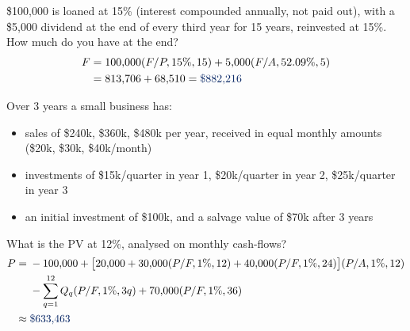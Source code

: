 \begin{example}
    \$100,000 is loaned at 15\% (interest compounded annually, not paid out),
    with a \$5,000 dividend at the end of every third year for 15 years,
    reinvested at 15\%. How much do you have at the end?
    \\
    \begin{align*}
        F &= 100{,}000(F/P,15\%,15) + 5{,}000(F/A,52.09\%,5)\\
        &= 813{,}706 + 68{,}510 = \db{\$882{,}216}
    \end{align*}
\end{example}

\begin{example}
    Over 3 years a small business has:
    \begin{itemize}
        \item sales of \$240k, \$360k, \$480k per year, received in equal monthly amounts (\$20k, \$30k, \$40k/month)
        \item investments of \$15k/quarter in year 1, \$20k/quarter in year 2, \$25k/quarter in year 3
        \item an initial investment of \$100k, and a salvage value of \$70k after 3 years
    \end{itemize}
    What is the PV at 12\%, analysed on monthly cash-flows?
    \\
    \begin{align*}
        P ={}& -100{,}000 + \big[20{,}000 + 30{,}000(P/F,1\%,12) + 40{,}000(P/F,1\%,24)\big](P/A,1\%,12)\\
        & - \sum_{q=1}^{12} Q_q (P/F,1\%,3q) + 70{,}000(P/F,1\%,36)\\
        \approx{}& \db{\$633{,}463}
    \end{align*}
\end{example}

